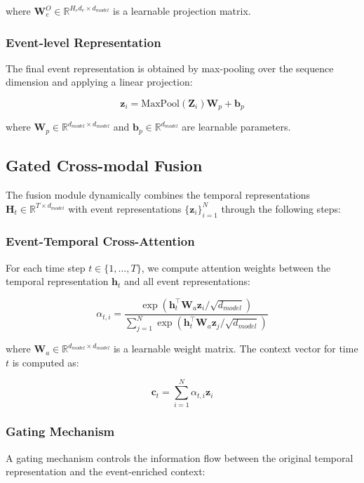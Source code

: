 where $\mathbf{W}_e^O \in \mathbb{R}^{H_ed_v \times d_{model}}$ is a learnable projection matrix.

\subsubsection{Event-level Representation}
The final event representation is obtained by max-pooling over the sequence dimension and applying a linear projection:

\begin{equation}
    \mathbf{z}_i = \text{MaxPool}(\mathbf{Z}_i)\mathbf{W}_p + \mathbf{b}_p
\end{equation}

where $\mathbf{W}_p \in \mathbb{R}^{d_{model} \times d_{model}}$ and $\mathbf{b}_p \in \mathbb{R}^{d_{model}}$ are learnable parameters.

\subsection{Gated Cross-modal Fusion}
The fusion module dynamically combines the temporal representations $\mathbf{H}_t \in \mathbb{R}^{T \times d_{model}}$ with event representations $\{\mathbf{z}_i\}_{i=1}^N$ through the following steps:

\subsubsection{Event-Temporal Cross-Attention}
For each time step $t \in \{1,...,T\}$, we compute attention weights between the temporal representation $\mathbf{h}_t$ and all event representations:

\begin{equation}
    \alpha_{t,i} = \frac{\exp(\mathbf{h}_t^\top \mathbf{W}_a \mathbf{z}_i / \sqrt{d_{model}})}{\sum_{j=1}^N \exp(\mathbf{h}_t^\top \mathbf{W}_a \mathbf{z}_j / \sqrt{d_{model}})}
\end{equation}

where $\mathbf{W}_a \in \mathbb{R}^{d_{model} \times d_{model}}$ is a learnable weight matrix. The context vector for time $t$ is computed as:

\begin{equation}
    \mathbf{c}_t = \sum_{i=1}^N \alpha_{t,i} \mathbf{z}_i
\end{equation}

\subsubsection{Gating Mechanism}
A gating mechanism controls the information flow between the original temporal representation and the event-enriched context:

